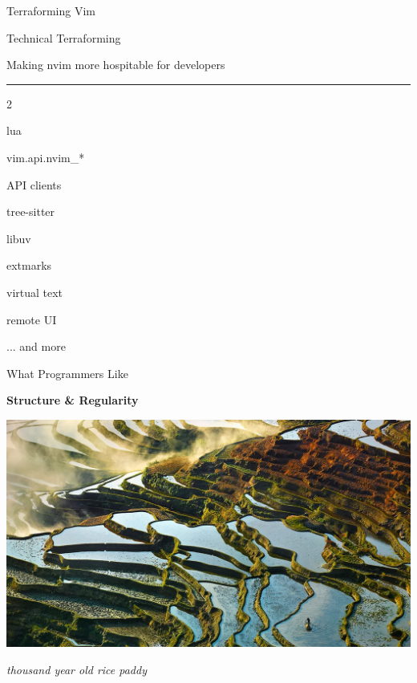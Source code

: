 \documentclass{beamer}
\begin{document}
\begin{frame}{Terraforming Vim}

	\begin{block}{Technical Terraforming}

		\vspace{0.5em}

		Making nvim more hospitable for developers

		\vspace{0.5em}

	\end{block}

	\rule{\textwidth}{0.1em}

	\begin{itemize}


	\end{itemize}

	... and more

\end{frame}


\begin{frame}{What Programmers Like}

	\textbf{Structure \& Regularity}

	\includegraphics[width=\textwidth]{rice_paddy}

	\textit{thousand year old rice paddy}

\end{frame}
\end{document}
